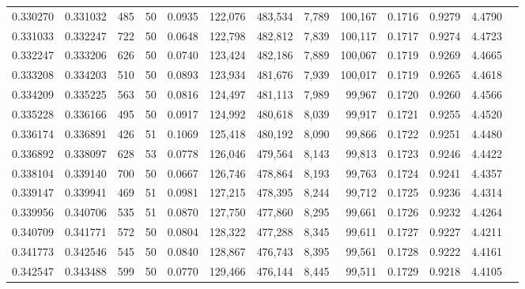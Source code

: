 \begin{tabular}{rrrrrrrrrrrrr}
0.330270 & 0.331032 &   485 &  50 &                                     0.0935 & 122,076 & 483,534 &   7,789 & 100,167 & 0.1716 & 0.9279 & 4.4790 \\
0.331033 & 0.332247 &   722 &  50 &                                     0.0648 & 122,798 & 482,812 &   7,839 & 100,117 & 0.1717 & 0.9274 & 4.4723 \\
0.332247 & 0.333206 &   626 &  50 &                                     0.0740 & 123,424 & 482,186 &   7,889 & 100,067 & 0.1719 & 0.9269 & 4.4665 \\
0.333208 & 0.334203 &   510 &  50 &                                     0.0893 & 123,934 & 481,676 &   7,939 & 100,017 & 0.1719 & 0.9265 & 4.4618 \\
0.334209 & 0.335225 &   563 &  50 &                                     0.0816 & 124,497 & 481,113 &   7,989 &  99,967 & 0.1720 & 0.9260 & 4.4566 \\
0.335228 & 0.336166 &   495 &  50 &                                     0.0917 & 124,992 & 480,618 &   8,039 &  99,917 & 0.1721 & 0.9255 & 4.4520 \\
0.336174 & 0.336891 &   426 &  51 &                                     0.1069 & 125,418 & 480,192 &   8,090 &  99,866 & 0.1722 & 0.9251 & 4.4480 \\
0.336892 & 0.338097 &   628 &  53 &                                     0.0778 & 126,046 & 479,564 &   8,143 &  99,813 & 0.1723 & 0.9246 & 4.4422 \\
0.338104 & 0.339140 &   700 &  50 &                                     0.0667 & 126,746 & 478,864 &   8,193 &  99,763 & 0.1724 & 0.9241 & 4.4357 \\
0.339147 & 0.339941 &   469 &  51 &                                     0.0981 & 127,215 & 478,395 &   8,244 &  99,712 & 0.1725 & 0.9236 & 4.4314 \\
0.339956 & 0.340706 &   535 &  51 &                                     0.0870 & 127,750 & 477,860 &   8,295 &  99,661 & 0.1726 & 0.9232 & 4.4264 \\
0.340709 & 0.341771 &   572 &  50 &                                     0.0804 & 128,322 & 477,288 &   8,345 &  99,611 & 0.1727 & 0.9227 & 4.4211 \\
0.341773 & 0.342546 &   545 &  50 &                                     0.0840 & 128,867 & 476,743 &   8,395 &  99,561 & 0.1728 & 0.9222 & 4.4161 \\
0.342547 & 0.343488 &   599 &  50 &                                     0.0770 & 129,466 & 476,144 &   8,445 &  99,511 & 0.1729 & 0.9218 & 4.4105 \\

\end{tabular}
